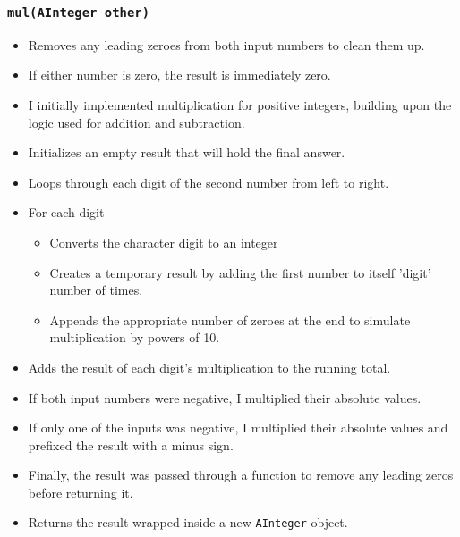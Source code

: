\documentclass{article}
\begin{document}
\subsubsection*{\texttt{mul(AInteger other)}}
\begin{itemize}
    \item Removes any leading zeroes from both input numbers to clean them up.
    \item If either number is zero, the result is immediately zero.
    \item I initially implemented multiplication for positive integers, building upon the logic used for addition and subtraction.
    \item Initializes an empty result that will hold the final answer.
    \item Loops through each digit of the second number from left to right.
    \item For each digit
    \begin{itemize}
        \item Converts the character digit to an integer
        \item Creates a temporary result by adding the first number to itself 'digit' number of times.
        \item Appends the appropriate number of zeroes at the end to simulate multiplication by powers of 10.
    \end{itemize}
    \item Adds the result of each digit’s multiplication to the running total.
    \item If both input numbers were negative, I multiplied their absolute values.
    \item If only one of the inputs was negative, I multiplied their absolute values and prefixed the result with a minus sign.
    \item Finally, the result was passed through a function to remove any leading zeros before returning it.
    \item Returns the result wrapped inside a new \texttt{AInteger} object.
\end{itemize}
\end{document}
